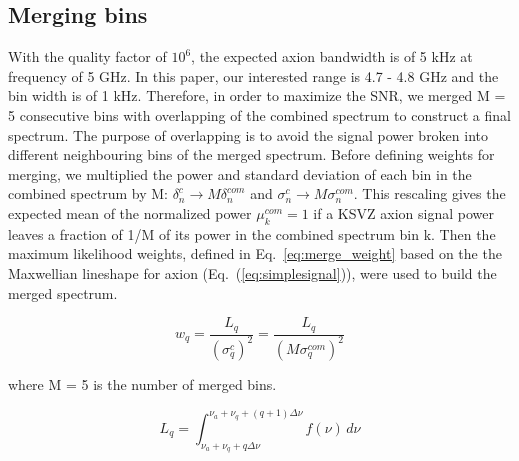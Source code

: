 \subsection{Merging bins}

With the quality factor of $10^6$, the expected axion bandwidth is of 5 kHz at frequency of 5 GHz. In this paper, our interested range is 4.7 - 4.8 GHz and the bin width is of 1 kHz. Therefore, in order to maximize the SNR, we merged M = 5 consecutive bins with overlapping of the combined spectrum to construct a final spectrum.
The purpose of overlapping is to avoid the signal power broken into different neighbouring bins of the merged spectrum. Before defining weights for merging, we multiplied the power and standard deviation of each bin in the combined spectrum by M: $\delta^{c}_n \rightarrow M\delta^{com}_n$ and $\sigma^{c}_n \rightarrow M \sigma^{com}_n$. This rescaling gives the expected mean of the normalized power $\mu^{com}_k = 1$ if a KSVZ axion signal power leaves a fraction of 1/M of its power in the combined spectrum bin k.
Then the maximum likelihood weights, defined in Eq.~\ref{eq:merge_weight} based on the the Maxwellian lineshape for axion (Eq.~(\ref{eq:simplesignal})), were used to build the merged spectrum.


\begin{equation}
    \label{eq:merge_weight}
    w_{q} = \frac{L_{q}}{(\sigma_{q}^{c})^{2}} = \frac{L_{q}}{(M\sigma_{q}^{com})^{2}}
\end{equation}

where M = 5 is the number of merged bins.


\begin{equation}
    \label{eq:Lq_integtal}
    L_{q} = \int_{\nu_a +\nu_q + q\Delta\nu}^{\nu_a +\nu_q + (q+1)\Delta\nu} f(\nu) \,d\nu
\end{equation}

